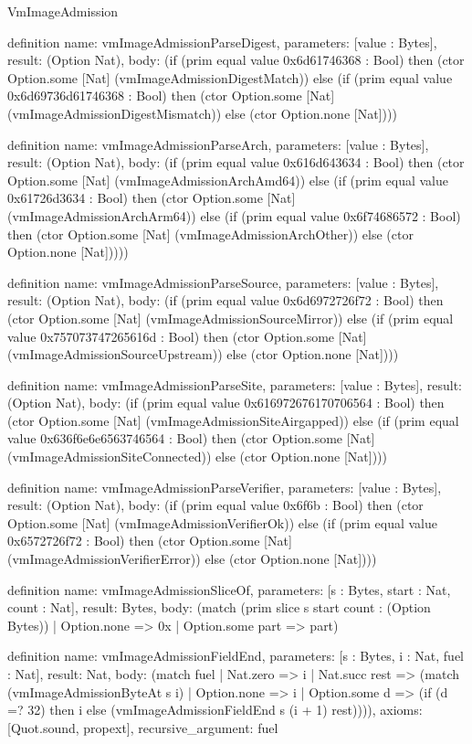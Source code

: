 \begin{lexlean}{VmImageAdmission}
\begin{semanticmodule}
definition{
  name: vmImageAdmissionParseDigest,
  parameters: [value : Bytes],
  result: (Option Nat),
  body: (if (prim equal value 0x6d61746368 : Bool) then (ctor Option.some [Nat] (vmImageAdmissionDigestMatch)) else (if (prim equal value 0x6d69736d61746368 : Bool) then (ctor Option.some [Nat] (vmImageAdmissionDigestMismatch)) else (ctor Option.none [Nat])))
}

definition{
  name: vmImageAdmissionParseArch,
  parameters: [value : Bytes],
  result: (Option Nat),
  body: (if (prim equal value 0x616d643634 : Bool) then (ctor Option.some [Nat] (vmImageAdmissionArchAmd64)) else (if (prim equal value 0x61726d3634 : Bool) then (ctor Option.some [Nat] (vmImageAdmissionArchArm64)) else (if (prim equal value 0x6f74686572 : Bool) then (ctor Option.some [Nat] (vmImageAdmissionArchOther)) else (ctor Option.none [Nat]))))
}

definition{
  name: vmImageAdmissionParseSource,
  parameters: [value : Bytes],
  result: (Option Nat),
  body: (if (prim equal value 0x6d6972726f72 : Bool) then (ctor Option.some [Nat] (vmImageAdmissionSourceMirror)) else (if (prim equal value 0x757073747265616d : Bool) then (ctor Option.some [Nat] (vmImageAdmissionSourceUpstream)) else (ctor Option.none [Nat])))
}

definition{
  name: vmImageAdmissionParseSite,
  parameters: [value : Bytes],
  result: (Option Nat),
  body: (if (prim equal value 0x616972676170706564 : Bool) then (ctor Option.some [Nat] (vmImageAdmissionSiteAirgapped)) else (if (prim equal value 0x636f6e6e6563746564 : Bool) then (ctor Option.some [Nat] (vmImageAdmissionSiteConnected)) else (ctor Option.none [Nat])))
}

definition{
  name: vmImageAdmissionParseVerifier,
  parameters: [value : Bytes],
  result: (Option Nat),
  body: (if (prim equal value 0x6f6b : Bool) then (ctor Option.some [Nat] (vmImageAdmissionVerifierOk)) else (if (prim equal value 0x6572726f72 : Bool) then (ctor Option.some [Nat] (vmImageAdmissionVerifierError)) else (ctor Option.none [Nat])))
}

definition{
  name: vmImageAdmissionSliceOf,
  parameters: [s : Bytes, start : Nat, count : Nat],
  result: Bytes,
  body: (match (prim slice s start count : (Option Bytes))
    | Option.none => 0x
    | Option.some part => part)
}

definition{
  name: vmImageAdmissionFieldEnd,
  parameters: [s : Bytes, i : Nat, fuel : Nat],
  result: Nat,
  body: (match fuel
    | Nat.zero => i
    | Nat.succ rest => (match (vmImageAdmissionByteAt s i)
      | Option.none => i
      | Option.some d => (if (d =? 32) then i else (vmImageAdmissionFieldEnd s (i + 1) rest)))),
  axioms: [Quot.sound, propext],
  recursive_argument: fuel
}


\end{semanticmodule}
\end{lexlean}

